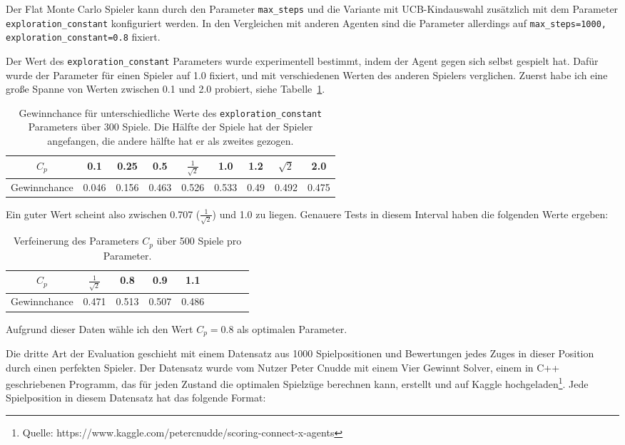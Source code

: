 Der Flat Monte Carlo Spieler kann durch den Parameter \verb|max_steps| und die Variante mit UCB-Kindauswahl zusätzlich mit dem Parameter \verb|exploration_constant| konfiguriert werden.
In den Vergleichen mit anderen Agenten sind die Parameter allerdings auf \verb|max_steps=1000, exploration_constant=0.8| fixiert.

Der Wert des \verb|exploration_constant| Parameters wurde experimentell bestimmt, indem der Agent gegen sich selbst gespielt hat.
Dafür wurde der Parameter für einen Spieler auf 1.0 fixiert, und mit verschiedenen Werten des anderen Spielers verglichen.
Zuerst habe ich eine große Spanne von Werten zwischen 0.1 und 2.0 probiert, siehe Tabelle~\ref{tab:flat-mc}.

\begin{table}[h!]
\centering
\begin{tabular}{ |c||c|c|c|c|c|c|c|c| }
 \hline
 $C_p$ & 0.1 & 0.25 & 0.5 & $\frac{1}{\sqrt{2}}$ & 1.0 & 1.2 & $\sqrt{2}$ & 2.0 \\
 \hline
 Gewinnchance & 0.046 & 0.156 & 0.463 & 0.526 & 0.533 & 0.49 & 0.492 & 0.475 \\
 \hline
\end{tabular}
\caption{Gewinnchance für unterschiedliche Werte des \texttt{exploration\_constant} Parameters über 300 Spiele. Die Hälfte der Spiele hat der Spieler angefangen, die andere hälfte hat er als zweites gezogen.}
\label{tab:flat-mc}
\end{table}

Ein guter Wert scheint also zwischen 0.707 ($\frac{1}{\sqrt{2}}$) und 1.0 zu liegen.
Genauere Tests in diesem Interval haben die folgenden Werte ergeben:

\begin{table}[h!]
\centering
\begin{tabular}{ |c||c|c|c|c|c|c|c|c| }
 \hline
 $C_p$ & $\frac{1}{\sqrt{2}}$ & 0.8 & 0.9 & 1.1 \\
 \hline
 Gewinnchance & 0.471 & 0.513 & 0.507 & 0.486 \\
 \hline
\end{tabular}
\caption{Verfeinerung des Parameters $C_p$ über 500 Spiele pro Parameter. }
\label{tab:flat-mc-2}
\end{table}

Aufgrund dieser Daten wähle ich den Wert $C_p = 0.8$ als optimalen Parameter.


Die dritte Art der Evaluation geschieht mit einem Datensatz aus 1000 Spielpositionen und Bewertungen jedes Zuges in dieser Position durch einen perfekten Spieler.
Der Datensatz wurde vom Nutzer Peter Cnudde mit einem Vier Gewinnt Solver, einem in C++ geschriebenen Programm, das für jeden Zustand die optimalen Spielzüge berechnen kann, erstellt und auf Kaggle hochgeladen\footnote{Quelle: https://www.kaggle.com/petercnudde/scoring-connect-x-agents}.
Jede Spielposition in diesem Datensatz hat das folgende Format:

